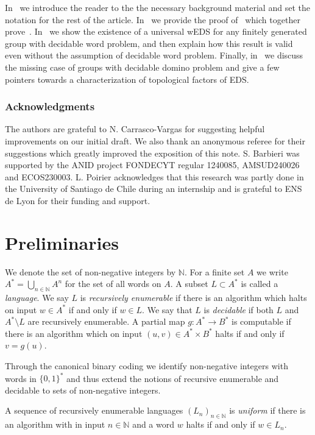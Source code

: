 \documentclass{article}
\theoremstyle{definition}
\theoremstyle{plain}
\newcommand{\NN}{\mathbb{N}}
\newcommand{\define}[1]{\textit{#1}}
\begin{document}
In~ we introduce the reader to the the necessary background material and set the notation for the rest of the article. In~ we provide the proof of~  which together prove~. In~ we show the existence of a universal wEDS for any finitely generated group with decidable word problem, and then explain how this result is valid even without the assumption of decidable word problem. Finally, in~ we discuss the missing case of groups with decidable domino problem and give a few pointers towards a characterization of topological factors of EDS.

\subsubsection*{Acknowledgments}
The authors are grateful to N. Carrasco-Vargas for suggesting helpful improvements on our initial draft. We also thank an anonymous referee for their suggestions which greatly improved the exposition of this note. S. Barbieri was supported by the ANID project FONDECYT regular 1240085, AMSUD240026  and ECOS230003. L. Poirier acknowledges that this research was partly done in the University of Santiago de Chile during an internship and is grateful to ENS de Lyon for their funding and support.



\section{Preliminaries}\label{sec:prelim}

We denote the set of non-negative integers by $\NN$. For a finite set $A$ we write $A^*= \bigcup_{n \in \NN}A^n$ for the set of all words on $A$. A subset $L\subset A^*$ is called a \define{language}. We say $L$ is \define{recursively enumerable} if there is an algorithm which halts on input $w \in A^*$ if and only if $w \in L$. We say that $L$ is \define{decidable} if both $L$ and $A^*\setminus L$ are recursively enumerable. A partial map $g\colon A^* \to B^*$ is computable if there is an algorithm which on input $(u,v) \in A^*\times B^*$ halts if and only if $v = g(u)$.

Through the canonical binary coding we identify non-negative integers with words in $\{0,1\}^*$ and thus extend the notions of recursive enumerable and decidable to sets of non-negative integers.

A sequence of recursively enumerable languages $(L_n)_{n \in \NN}$ is \define{uniform} if there is an algorithm with in input $n \in \NN$ and a word $w$ halts if and only if $w \in L_n$.
\end{document}
